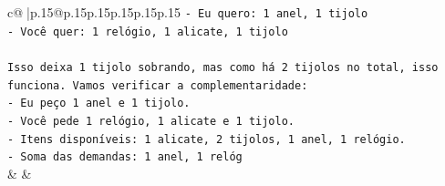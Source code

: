 \documentclass{article}
\begin{document}
{\begin{supertabular}{c@{$\;$}|p{.15\linewidth}@{}p{.15\linewidth}p{.15\linewidth}p{.15\linewidth}p{.15\linewidth}p{.15\linewidth}}
{{{\texttt{{-} Eu quero: 1 anel, 1 tijolo} \\
\texttt{{-} Você quer: 1 relógio, 1 alicate, 1 tijolo} \\
\\ 
\texttt{Isso deixa 1 tijolo sobrando, mas como há 2 tijolos no total, isso funciona. Vamos verificar a complementaridade:} \\
\texttt{{-} Eu peço 1 anel e 1 tijolo.} \\
\texttt{{-} Você pede 1 relógio, 1 alicate e 1 tijolo.} \\
\texttt{{-} Itens disponíveis: 1 alicate, 2 tijolos, 1 anel, 1 relógio.} \\
\texttt{{-} Soma das demandas: 1 anel, 1 relóg} \\
            }
        }
    }
    & & \\ \\


\end{supertabular}}
\end{document}
